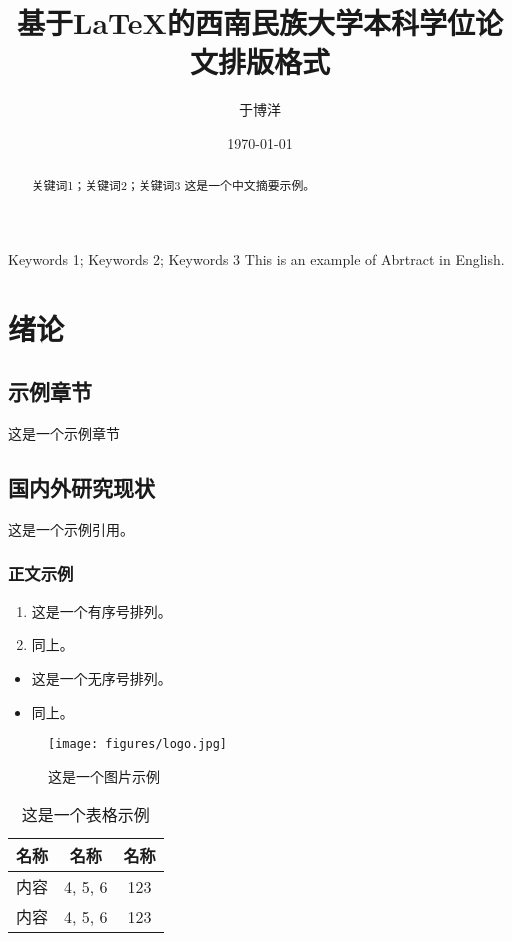 \documentclass[a4paper,twoside]{ctexrep} %
\title{基于\LaTeX 的西南民族大学本科学位论文排版格式}
\author{于博洋}
\date{\today}
\begin{document}
\makecover

\begin{abstract}{关键词1；关键词2；关键词3}  %
这是一个中文摘要示例。
\end{abstract}


\begin{abstractEng}{Keywords 1; Keywords 2; Keywords 3}
This is an example of Abrtract in English.
\end{abstractEng}


\cfoot{\thepage} %
\setcounter{page}{1}
\pagestyle{fancy}

\chapter{绪论}
\section{示例章节}
这是一个示例章节
\section{国内外研究现状}
这是一个示例引用。\textsuperscript{\cite{dongshihai2004}}

\subsection{正文示例}

\begin{enumerate}
	\item 这是一个有序号排列。
	\item 同上。
\end{enumerate}

\begin{itemize}
	\item 这是一个无序号排列。
	\item 同上。
	
\end{itemize}


\begin{figure}[htbp!]
	\centering
	\texttt{[image: figures/logo.jpg]}
	\caption{这是一个图片示例}\label{fig1}
\end{figure}

\begin{table}[H]
	\centering
	\caption{这是一个表格示例}
	\begin{tabular}{ccc}
			\toprule
			名称 & 名称 & 名称 \\ \midrule
			内容 & 4, 5, 6 & 123 \\
			内容 & 4, 5, 6 & 123 \\ \bottomrule
	\end{tabular}
\end{table}
\end{document}
